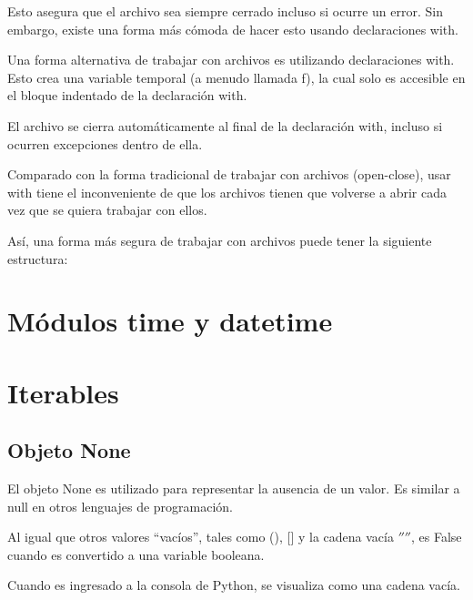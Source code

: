 \documentclass{report}
\newcommand{\doble}[1]{``#1''}
\begin{document}

Esto asegura que el archivo sea siempre cerrado incluso si ocurre un error.
Sin embargo, existe una forma más cómoda de hacer esto usando declaraciones with.

Una forma alternativa de trabajar con archivos es utilizando declaraciones with. Esto crea una variable temporal (a menudo llamada f), la cual solo es accesible en el bloque indentado de la declaración with.


El archivo se cierra automáticamente al final de la declaración with, incluso si ocurren excepciones dentro de ella.

Comparado con la forma tradicional de trabajar con archivos (open-close), usar with tiene el inconveniente de que los archivos tienen que volverse a abrir cada vez que se quiera trabajar con ellos.

Así, una forma más segura de trabajar con archivos puede tener la siguiente estructura:


\clearpage\chapter{Módulos time y datetime}

\clearpage\chapter{Iterables}

\section{Objeto None}


El objeto None es utilizado para representar la ausencia de un valor. Es similar a null en otros lenguajes de programación.

Al igual que otros valores \doble{vacíos}, tales como (), [] y la cadena vacía $''$$''$, es False cuando es convertido a una variable booleana.

Cuando es ingresado a la consola de Python, se visualiza como una cadena vacía.

\end{document}
